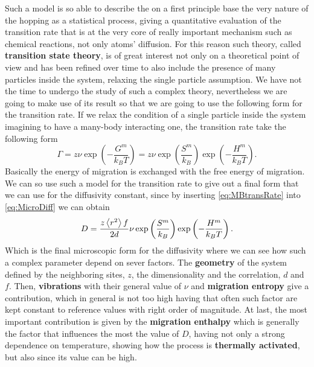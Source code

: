 Such a model is so able to describe the on a first principle base the very nature of the hopping as a statistical process, giving a quantitative evaluation of the transition rate that is at the very core of really important mechanism such as chemical reactions, not only atoms' diffusion. For this reason such theory, called \textbf{transition state theory}, is of great interest not only on a theoretical point of view and has been refined over time to also include the presence of many particles inside the system, relaxing the single particle assumption. We have not the time to undergo the study of such a complex theory, nevertheless we are going to make use of its result so that we are going to use the following form for the transition rate.
{
    If we relax the condition of a single particle inside the system imagining to have a many-body interacting one, the transition rate take the following form
    \begin{equation}
        \label{eq:MBtransRate}
        \Gamma = z\nu\exp\left( -\frac{G^m}{k_BT} \right) = z\nu\exp\left( \frac{S^m}{k_B} \right)\exp\left( -\frac{H^m}{k_BT} \right).
    \end{equation}
} 
\noindent
Basically the energy of migration is exchanged with the free energy of migration. We can so use such a model for the transition rate to give out a final form that we can use for the diffusivity constant, since by inserting \eqref{eq:MBtransRate} into \eqref{eq:MicroDiff} we can obtain
\begin{equation}
    D = \frac{z\left\langle r^2 \right\rangle f}{2d}\nu\exp\left( \frac{S^m}{k_B} \right)\exp\left( -\frac{H^m}{k_BT} \right).
\end{equation}
Which is the final microscopic form for the diffusivity where we can see how such a complex parameter depend on sever factors. The \textbf{geometry} of the system defined by the neighboring sites, $z$, the dimensionality and the correlation, $d$ and $f$. Then, \textbf{vibrations} with their general value of $\nu$ and \textbf{migration entropy} give a contribution, which in general is not too high having that often such factor are kept constant to reference values with right order of magnitude. At last, the most important contribution is given by the \textbf{migration enthalpy} which is generally the factor that influences the most the value of $D$, having not only a strong dependence on temperature, showing how the process is \textbf{thermally activated}, but also since its value can be high.

